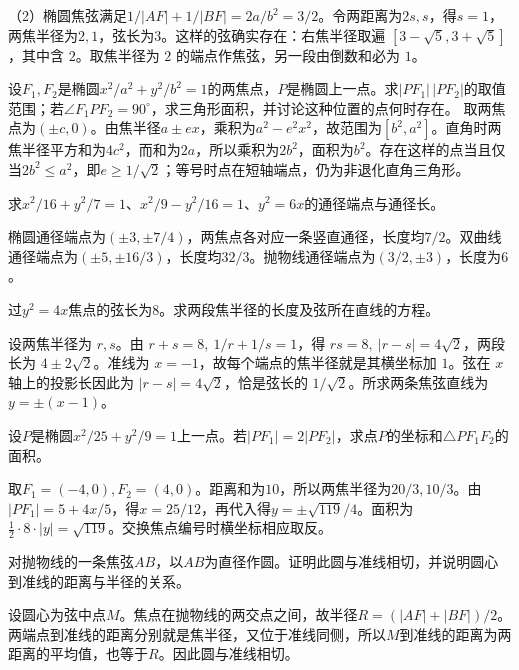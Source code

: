 （2）椭圆焦弦满足\(1/|AF|+1/|BF|=2a/b^2=3/2\)。令两距离为\(2s,s\)，得\(s=1\)，两焦半径为\(2,1\)，弦长为\(3\)。这样的弦确实存在：右焦半径取遍 \([3-\sqrt5,3+\sqrt5]\)，其中含 \(2\)。取焦半径为 \(2\) 的端点作焦弦，另一段由倒数和必为 \(1\)。


设\(F_1,F_2\)是椭圆\(x^2/a^2+y^2/b^2=1\)的两焦点，\(P\)是椭圆上一点。求\(|PF_1|\,|PF_2|\)的取值范围；若\(\angle F_1PF_2=90^\circ\)，求三角形面积，并讨论这种位置的点何时存在。
\solutionanswer
取两焦点为\((\pm c,0)\)。由焦半径\(a\pm ex\)，乘积为\(a^2-e^2x^2\)，故范围为\([b^2,a^2]\)。直角时两焦半径平方和为\(4c^2\)，而和为\(2a\)，所以乘积为\(2b^2\)，面积为\(b^2\)。存在这样的点当且仅当\(2b^2\le a^2\)，即\(e\ge1/\sqrt2\)；等号时点在短轴端点，仍为非退化直角三角形。


求\(x^2/16+y^2/7=1\)、\(x^2/9-y^2/16=1\)、\(y^2=6x\)的通径端点与通径长。
\par
\solutionanswer
椭圆通径端点为\((\pm3,\pm7/4)\)，两焦点各对应一条竖直通径，长度均\(7/2\)。双曲线通径端点为\((\pm5,\pm16/3)\)，长度均\(32/3\)。抛物线通径端点为\((3/2,\pm3)\)，长度为\(6\)。


过\(y^2=4x\)焦点的弦长为\(8\)。求两段焦半径的长度及弦所在直线的方程。
\par
\solutionanswer
设两焦半径为 \(r,s\)。由 \(r+s=8,\ 1/r+1/s=1\)，得 \(rs=8,\ |r-s|=4\sqrt2\)，两段长为 \(4\pm2\sqrt2\)。准线为 \(x=-1\)，故每个端点的焦半径就是其横坐标加 \(1\)。弦在 \(x\) 轴上的投影长因此为 \(|r-s|=4\sqrt2\)，恰是弦长的 \(1/\sqrt2\)。所求两条焦弦直线为 \(y=\pm(x-1)\)。


设\(P\)是椭圆\(x^2/25+y^2/9=1\)上一点。若\(|PF_1|=2|PF_2|\)，求点\(P\)的坐标和\(\triangle PF_1F_2\)的面积。
\par
\solutionanswer
取\(F_1=(-4,0),F_2=(4,0)\)。距离和为\(10\)，所以两焦半径为\(20/3,10/3\)。由\(|PF_1|=5+4x/5\)，得\(x=25/12\)，再代入得\(y=\pm\sqrt{119}/4\)。面积为\(\frac12\cdot8\cdot|y|=\sqrt{119}\)。交换焦点编号时横坐标相应取反。


对抛物线的一条焦弦\(AB\)，以\(AB\)为直径作圆。证明此圆与准线相切，并说明圆心到准线的距离与半径的关系。
\par
\solutionanswer
设圆心为弦中点\(M\)。焦点在抛物线的两交点之间，故半径\(R=(|AF|+|BF|)/2\)。两端点到准线的距离分别就是焦半径，又位于准线同侧，所以\(M\)到准线的距离为两距离的平均值，也等于\(R\)。因此圆与准线相切。


